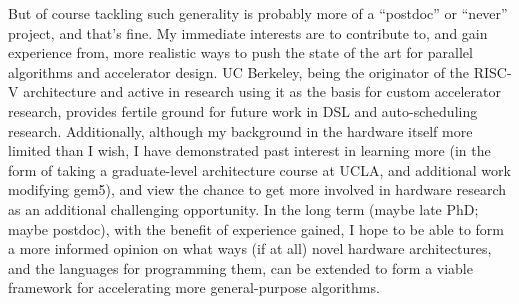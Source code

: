But of course tackling such generality is probably more of a ``postdoc'' or ``never'' project, and that's fine. My immediate interests are to contribute to, and gain experience from, more realistic ways to push the state of the art for parallel algorithms and accelerator design. UC Berkeley, being the originator of the RISC-V architecture and active in research using it as the basis for custom accelerator research, provides fertile ground for future work in DSL and auto-scheduling research. Additionally, although my background in the hardware itself more limited than I wish, I have demonstrated past interest in learning more (in the form of taking a graduate-level architecture course at UCLA, and additional work modifying gem5), and view the chance to get more involved in hardware research as an additional challenging opportunity. In the long term (maybe late PhD; maybe postdoc), with the benefit of experience gained, I hope to be able to form a more informed opinion on what ways (if at all) novel hardware architectures, and the languages for programming them, can be extended to form a viable framework for accelerating more general-purpose algorithms.


